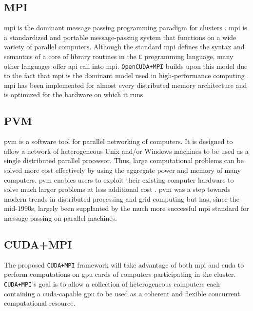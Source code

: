 \subsection{MPI}

\Gls{mpi} is the dominant message passing programming paradigm for clusters
\cite{website:Message-Passing-Interface-Forum}
\cite{website:Message-Passing-Interface}. \gls{mpi} is a standardized and
portable message-passing system that functions on a wide variety of parallel
computers. Although the standard \gls{mpi} defines the syntax and semantics of
a core of library routines in the \texttt{C} programming language, many other
languages offer \gls{api} call into \gls{mpi}. \texttt{OpenCUDA+MPI} builds
upon this model due to the fact that \gls{mpi} is the dominant model used in
high-performance computing \cite{sur2006high}. \Gls{mpi} has been implemented
for almost every distributed memory architecture and is optimized for the
hardware on which it runs.

\subsection{PVM}

\Gls{pvm} is a software tool for parallel networking of computers. It is
designed to allow a network of heterogeneous Unix and/or Windows machines to be
used as a single distributed parallel processor. Thus, large computational
problems can be solved more cost effectively by using the aggregate power and
memory of many computers. \gls{pvm} enables users to exploit their existing
computer hardware to solve much larger problems at less additional cost
\cite{website:Computer-Science-and-Division}. \gls{pvm} was a step towards
modern trends in distributed processing and grid computing but has, since the
mid-1990s, largely been supplanted by the much more successful \gls{mpi}
standard for message passing on parallel machines.

\subsection{CUDA+MPI}

The proposed \texttt{CUDA+MPI} framework will take advantage of both \gls{mpi}
and \gls{cuda} to perform computations on \gls{gpu} cards of computers
participating in the cluster. \texttt{CUDA+MPI}'s goal is to allow a collection
of heterogeneous computers each containing a \gls{cuda}-capable \gls{gpu} to be
used as a coherent and flexible concurrent computational resource.
